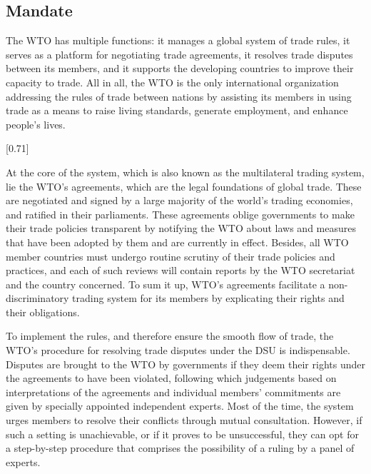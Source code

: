 \subsection{Mandate}

The WTO has multiple functions: it manages a global system of trade rules, it serves as a platform for negotiating trade agreements, it resolves trade disputes between its members, and it supports the developing countries to improve their capacity to trade. All in all, the WTO is the only international organization addressing the rules of trade between nations by assisting its members in using trade as a means to raise living standards, generate employment, and enhance people’s lives.

[0.71]

At the core of the system, which is also known as the multilateral trading system, lie the WTO’s agreements, which are the legal foundations of global trade. These are negotiated and signed by a large majority of the world’s trading economies, and ratified in their parliaments. These agreements oblige governments to make their trade policies transparent by notifying the WTO about laws and measures that have been adopted by them and are currently in effect. Besides, all WTO member countries must undergo routine scrutiny of their trade policies and practices, and each of such reviews will contain reports by the WTO secretariat and the country concerned. To sum it up, WTO’s agreements facilitate a non-discriminatory trading system for its members by explicating their rights and their obligations.

To implement the rules, and therefore ensure the smooth flow of trade, the WTO’s procedure for resolving trade disputes under the DSU is indispensable. Disputes are brought to the WTO by governments if they deem their rights under the agreements to have been violated, following which judgements based on interpretations of the agreements and individual members’ commitments are given by specially appointed independent experts. Most of the time, the system urges members to resolve their conflicts through mutual consultation. However, if such a setting is unachievable, or if it proves to be unsuccessful, they can opt for a step-by-step procedure that comprises the possibility of a ruling by a panel of experts.

